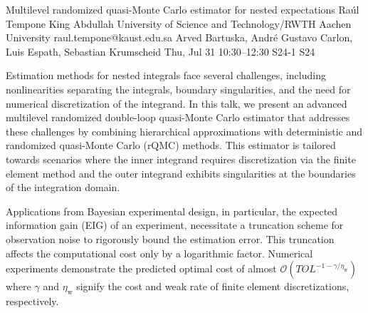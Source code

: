 \begin{talk}
  {Multilevel randomized quasi-Monte Carlo estimator for nested expectations}%
  {Ra\'{u}l Tempone}%
  {King Abdullah University of Science and Technology/RWTH Aachen University}%
  {raul.tempone@kaust.edu.sa}%
  {Arved Bartuska, Andr\'{e} Gustavo Carlon, Luis Espath, Sebastian Krumscheid}%
  {}%
  {Thu, Jul 31 10:30–12:30}%
  {S24-1}%
  {S24}%
  
				
			
Estimation methods for nested integrals face several challenges, including nonlinearities separating the integrals, boundary singularities, and the need for numerical discretization of the integrand. In this talk, we present an advanced multilevel randomized double-loop quasi-Monte Carlo estimator that addresses these challenges by combining hierarchical approximations with deterministic and randomized quasi-Monte Carlo (rQMC) methods. This estimator is tailored towards scenarios where the inner integrand requires discretization via the finite element method and the outer integrand exhibits singularities at the boundaries of the integration domain. 

Applications from Bayesian experimental design, in particular, the expected information gain (EIG) of an experiment, necessitate a truncation scheme for observation noise to rigorously bound the estimation error. This truncation affects the computational cost only by a logarithmic factor. Numerical experiments demonstrate the predicted optimal cost of almost $\mathcal{O}(TOL^{-1-\gamma/\eta_{\text{w}}})$ where $\gamma$ and $\eta_{\text{w}}$ signify the cost and weak rate of finite element discretizations, respectively.

\end{talk}

